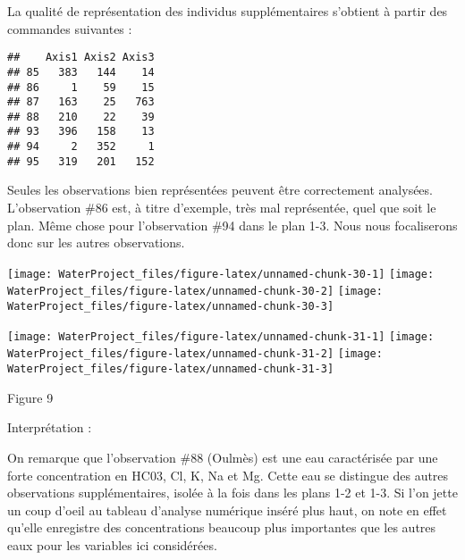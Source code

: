 \documentclass[]{article}
\newenvironment{Shaded}{\begin{snugshade}}{\end{snugshade}}
\newcommand{\KeywordTok}[1]{\textcolor[rgb]{0.13,0.29,0.53}{\textbf{#1}}}
\newcommand{\DecValTok}[1]{\textcolor[rgb]{0.00,0.00,0.81}{#1}}
\newcommand{\StringTok}[1]{\textcolor[rgb]{0.31,0.60,0.02}{#1}}
\newcommand{\OperatorTok}[1]{\textcolor[rgb]{0.81,0.36,0.00}{\textbf{#1}}}
\newcommand{\NormalTok}[1]{#1}
\begin{document}
La qualité de représentation des individus supplémentaires s'obtient à
partir des commandes suivantes :

\begin{Shaded}
\end{Shaded}

\begin{verbatim}
##    Axis1 Axis2 Axis3
## 85   383   144    14
## 86     1    59    15
## 87   163    25   763
## 88   210    22    39
## 93   396   158    13
## 94     2   352     1
## 95   319   201   152
\end{verbatim}

Seules les observations bien représentées peuvent être correctement
analysées. L'observation \#86 est, à titre d'exemple, très mal
représentée, quel que soit le plan. Même chose pour l'observation \#94
dans le plan 1-3. Nous nous focaliserons donc sur les autres
observations.

\texttt{[image: WaterProject\_files/figure-latex/unnamed-chunk-30-1]}
\texttt{[image: WaterProject\_files/figure-latex/unnamed-chunk-30-2]}
\texttt{[image: WaterProject\_files/figure-latex/unnamed-chunk-30-3]}

\texttt{[image: WaterProject\_files/figure-latex/unnamed-chunk-31-1]}
\texttt{[image: WaterProject\_files/figure-latex/unnamed-chunk-31-2]}
\texttt{[image: WaterProject\_files/figure-latex/unnamed-chunk-31-3]}

Figure 9

Interprétation :

On remarque que l'observation \#88 (Oulmès) est une eau caractérisée par
une forte concentration en HC03, Cl, K, Na et Mg. Cette eau se distingue
des autres observations supplémentaires, isolée à la fois dans les plans
1-2 et 1-3. Si l'on jette un coup d'oeil au tableau d'analyse numérique
inséré plus haut, on note en effet qu'elle enregistre des concentrations
beaucoup plus importantes que les autres eaux pour les variables ici
considérées.
\end{document}
